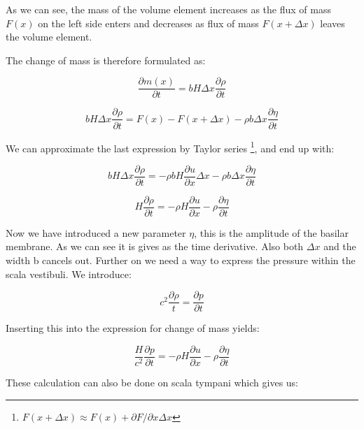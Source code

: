 \documentclass[twoside,twocolumn]{article}
\begin{document}
 As we can see, the mass of the volume element increases as the flux of mass $F(x)$ on the left side enters and decreases as flux of mass $F(x + \Delta x)$ leaves the volume element. 
 
 The change of mass is therefore formulated as: 
 
\begin{equation}
\frac{\partial m(x)}{\partial t} = bH \Delta x \frac{\partial \rho}{\partial t} 
\end{equation}
 
\begin{equation}
bH \Delta x \frac{\partial \rho}{\partial t} = F(x) - F(x + \Delta x) - \rho b \Delta x \frac{\partial \eta}{\partial t}
\end{equation}
 
 We can approximate the last expression by Taylor series \footnote{$F(x + \Delta x) \approx F(x) + \partial F/\partial x \Delta x$}, and end up with: 
 
 \begin{equation}
bH \Delta x \frac{\partial \rho}{\partial t} = -\rho b H \frac{\partial u}{\partial x} \Delta x - \rho b \Delta x \frac{\partial \eta}{\partial t}
\end{equation}

 \begin{equation}
H\frac{\partial \rho}{\partial t} = -\rho H \frac{\partial u}{\partial x}  - \rho \frac{\partial \eta}{\partial t}
\end{equation}
 
 
 Now we have introduced a new parameter $\eta$, this is the amplitude of the basilar membrane. As we can see it is gives as the time derivative. Also both $\Delta x$ and the width b cancels out.  Further on we need a way to express the pressure within the scala vestibuli. We introduce: 
 
 \begin{equation}
c^2 \frac{\partial \rho}{t} = \frac{\partial p}{\partial t}
\end{equation}

Inserting this into the expression for change of mass yields: 

 \begin{equation}\label{eq:1}
\frac{H}{c^2}\frac{\partial p}{\partial t} = -\rho H \frac{\partial u}{\partial x}  - \rho \frac{\partial \eta}{\partial t}
\end{equation}

These calculation can also be done on scala tympani which gives us: 
\end{document}

